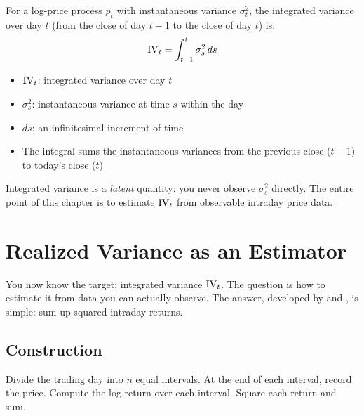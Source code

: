 \begin{definition}
For a log-price process $p_t$ with instantaneous variance $\sigma^2_t$, the integrated variance over day $t$ (from the close of day $t-1$ to the close of day $t$) is:
\begin{equation}
  \operatorname{IV}_t = \int_{t-1}^{t} \sigma^2_s \, ds
  \label{eq:iv}
\end{equation}
\begin{itemize}[nosep]
  \item $\operatorname{IV}_t$: integrated variance over day $t$
  \item $\sigma^2_s$: instantaneous variance at time $s$ within the day
  \item $ds$: an infinitesimal increment of time
  \item The integral sums the instantaneous variances from the previous close ($t-1$) to today's close ($t$)
\end{itemize}
\end{definition}

Integrated variance is a \emph{latent} quantity: you never observe $\sigma^2_s$ directly.
The entire point of this chapter is to estimate $\operatorname{IV}_t$ from observable intraday price data.

\section{Realized Variance as an Estimator}
\label{sec:rv-estimator}

You now know the target: integrated variance $\operatorname{IV}_t$.
The question is how to estimate it from data you can actually observe.
The answer, developed by \citet{ABDL2001} and \citet{BNS2002}, is simple: sum up squared intraday returns.

\subsection{Construction}

Divide the trading day into $n$ equal intervals.
At the end of each interval, record the price.
Compute the log return over each interval.
Square each return and sum.

